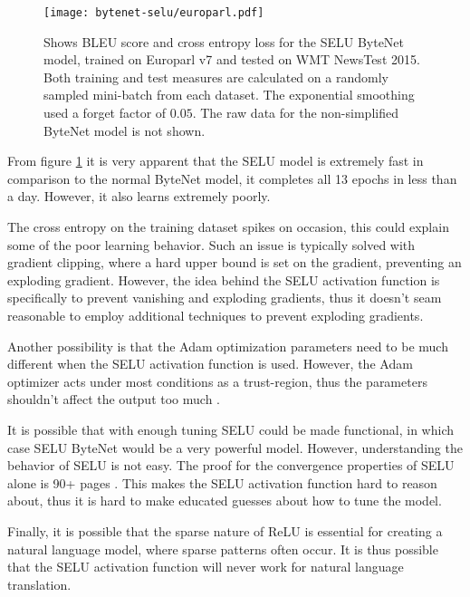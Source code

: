 \begin{figure}[h]
    \centering
    \texttt{[image: bytenet-selu/europarl.pdf]}
    \caption{Shows BLEU score and cross entropy loss for the SELU ByteNet model, trained on Europarl v7 and tested on WMT NewsTest 2015. Both training and test measures are calculated on a randomly sampled mini-batch from each dataset. The exponential smoothing used a forget factor of $0.05$. The raw data for the non-simplified ByteNet model is not shown.}
    \label{fig:result:bytenet-selu:europarl}
\end{figure}

From figure \ref{fig:result:bytenet-selu:europarl} it is very apparent that the SELU model is extremely fast in comparison to the normal ByteNet model, it completes all 13 epochs in less than a day. However, it also learns extremely poorly.

The cross entropy on the training dataset spikes on occasion, this could explain some of the poor learning behavior. Such an issue is typically solved with gradient clipping, where a hard upper bound is set on the gradient, preventing an exploding gradient. However, the idea behind the SELU activation function is specifically to prevent vanishing and exploding gradients, thus it doesn't seam reasonable to employ additional techniques to prevent exploding gradients.

Another possibility is that the Adam optimization parameters need to be much different when the SELU activation function is used. However, the Adam optimizer acts under most conditions as a trust-region, thus the parameters shouldn't affect the output too much \cite{adam-optimization}.

It is possible that with enough tuning SELU could be made functional, in which case SELU ByteNet would be a very powerful model. However, understanding the behavior of SELU is not easy. The proof for the convergence properties of SELU alone is 90+ pages \cite{selu}. This makes the SELU activation function hard to reason about, thus it is hard to make educated guesses about how to tune the model.

Finally, it is possible that the sparse nature of ReLU is essential for creating a natural language model, where sparse patterns often occur. It is thus possible that the SELU activation function will never work for natural language translation.